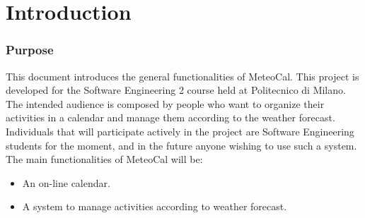 \documentclass[10pt,a4paper,titlepage]{article}
\begin{document}


\part{Introduction}

\section{Purpose}
This document introduces the general functionalities of MeteoCal. This project is developed for the Software Engineering 2 course held at Politecnico di Milano. The intended audience is composed by people who want to organize their activities in a calendar and manage them according to the weather forecast. Individuals that will participate actively in the project are Software Engineering students for the moment, and in the future anyone wishing to use such a system.
The main functionalities of MeteoCal will be:
\begin{itemize}
\item An on-line calendar.
\item A system to manage activities according to weather forecast.
\end{itemize}
\end{document}
